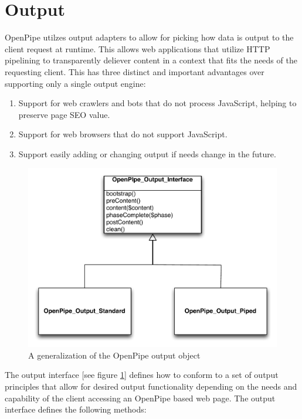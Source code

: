 \documentclass[12pt]{report}
\begin{document}
\section{Output}

OpenPipe utilzes output adapters to allow for picking how data is output to the client request at runtime. This allows web applications that utilize HTTP pipelining to transparently deliever content in a context that fits the needs of the requesting client. This has three distinct and important advantages over supporting only a single output engine:

\begin{enumerate}
	\item Support for web crawlers and bots that do not process JavaScript, helping to preserve page SEO value.
	\item Support for web browsers that do not support JavaScript.
	\item Support easily adding or changing output if needs change in the future.
\end{enumerate}


\begin{figure}[H]
\centering
\includegraphics[width=\textwidth,keepaspectratio]{figures/images/generalization_output.pdf}
\caption{A generalization of the OpenPipe output object}
\label{fig:generalizationOutput}
\end{figure}

The output interface [see figure \ref{fig:generalizationOutput}] defines how to conform to a set of output principles that allow for desired output functionality depending on the needs and capability of the client accessing an OpenPipe based web page.  The output interface defines the following methods:
\end{document}
